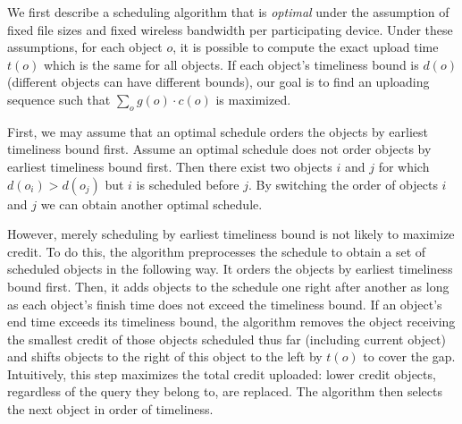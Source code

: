 %

%
We first describe a scheduling algorithm that is \emph{optimal} under
the assumption of fixed file sizes and fixed wireless bandwidth per
participating device.
%
Under these assumptions, for each object $o$, it is possible to
compute the exact upload time $t(o)$ which is the same for all
objects.
%
If each object's timeliness bound is $d(o)$ (different objects can have
different bounds), our goal is to find an uploading sequence such
that $\sum_{o} g(o)\cdot c(o)$ is maximized.

First, we may assume that an optimal schedule orders the objects by
earliest timeliness bound first.
%
Assume an optimal schedule does not order objects by earliest
timeliness bound first.
%
Then there exist two objects $i$ and $j$ for which $d(o_i)>d(o_j)$ but $i$
is scheduled before $j$.
%
By switching the order of objects $i$ and $j$ we can obtain
another optimal schedule.
%

However, merely scheduling by earliest timeliness bound is not likely to
maximize credit.
%
To do this, the algorithm preprocesses the schedule to obtain a set of
scheduled objects in the following way.
%
It orders the objects by earliest timeliness bound first.
%
Then, it adds objects to the schedule one right after another as long
as each object's finish time does not exceed the timeliness bound.
%
If an object's end time exceeds its timeliness bound, the algorithm removes
the object receiving the smallest credit of those objects scheduled thus
far (including current object) and shifts objects to the right of this
object to the left by $t(o)$ to cover the gap.
%
Intuitively, this step maximizes the total credit
uploaded: lower credit objects, regardless of the query they belong
to, are replaced.
%
The algorithm then selects the next object in order of timeliness.


